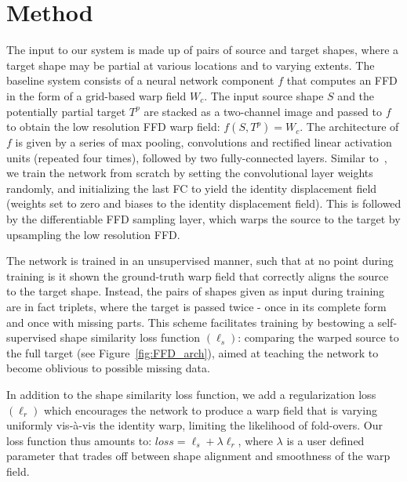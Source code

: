 \documentclass[acmtog,timestamp]{acmart}%
\begin{document}
\section{Method}

The input to our system is made up of pairs of source and target shapes, where a target shape may be partial at various locations and to varying extents. The baseline system consists of a neural network component $f$ that computes an FFD in the form of a grid-based warp field $W_c$.
The input source shape $S$ and the potentially partial target $T^p$ are stacked as a two-channel image and passed to $f$ to obtain the low resolution FFD warp field: $f(S,T^p) = W_c$. The architecture of $f$ is given by a series of max pooling, convolutions and rectified linear activation units (repeated four times), followed by two fully-connected layers. Similar to~\cite{spatialtransformer}, we train the network from scratch by setting the convolutional layer weights randomly, and initializing the last FC to yield the identity displacement field (weights set to zero and biases to the identity displacement field). This is followed by the differentiable FFD sampling layer, which warps the source to the target by upsampling the low resolution FFD.

The network is trained in an unsupervised manner, such that at no point during training is it shown the ground-truth warp field that correctly aligns the source to the target shape.
Instead, the pairs of shapes given as input during training are in fact triplets, where the target is passed twice - once in its complete form and once with missing parts. 
This scheme facilitates training by bestowing a self-supervised shape similarity loss function $(\ell_s)$: comparing the warped source to the full target (see Figure~\ref{fig:FFD_arch}), aimed at teaching the network to become oblivious to possible missing data. 

In addition to the shape similarity loss function, we add a regularization loss $(\ell_r)$ which encourages the network to produce a warp field that is varying uniformly vis-\`a-vis the identity warp, limiting the likelihood of fold-overs. Our loss function thus amounts to: $loss = \ell_s + \lambda \ell_r$, where $\lambda$ is a user defined parameter that trades off between shape alignment and smoothness of the warp field.
\end{document}
